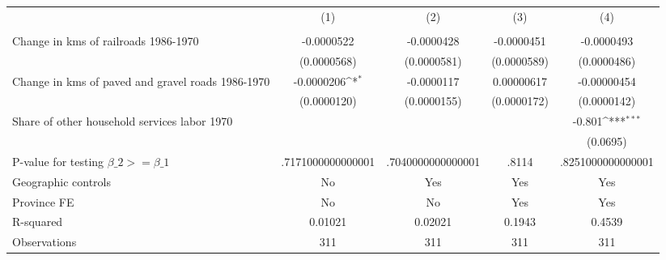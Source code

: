 {
\def\sym#1{\ifmmode^{#1}\else\(^{#1}\)\fi}
\begin{tabular}{l*{4}{c}}
\hline\hline
                &\multicolumn{1}{c}{(1)}&\multicolumn{1}{c}{(2)}&\multicolumn{1}{c}{(3)}&\multicolumn{1}{c}{(4)}\\
                &\multicolumn{1}{c}{}&\multicolumn{1}{c}{}&\multicolumn{1}{c}{}&\multicolumn{1}{c}{}\\
\hline
Change in kms of railroads 1986-1970&-0.0000522         &-0.0000428         &-0.0000451         &-0.0000493         \\
                &(0.0000568)         &(0.0000581)         &(0.0000589)         &(0.0000486)         \\
[1em]
Change in kms of paved and gravel roads 1986-1970&-0.0000206\sym{*}  &-0.0000117         &0.00000617         &-0.00000454         \\
                &(0.0000120)         &(0.0000155)         &(0.0000172)         &(0.0000142)         \\
[1em]
Share of other household services labor 1970&                  &                  &                  &   -0.801\sym{***}\\
                &                  &                  &                  & (0.0695)         \\
\hline
P-value for testing $\beta\_{2} >= \beta\_{1}$&.7171000000000001         &.7040000000000001         &    .8114         &.8251000000000001         \\
Geographic controls&       No         &      Yes         &      Yes         &      Yes         \\
Province FE     &       No         &       No         &      Yes         &      Yes         \\
R-squared       &  0.01021         &  0.02021         &   0.1943         &   0.4539         \\
Observations    &      311         &      311         &      311         &      311         \\
\hline\hline
\end{tabular}
}
